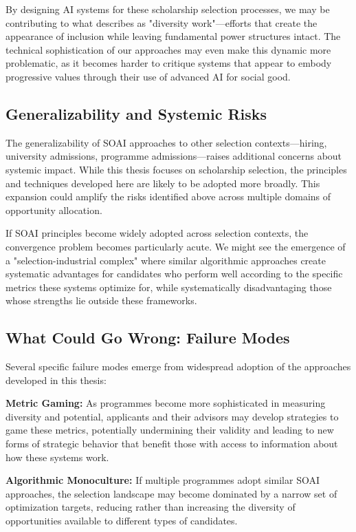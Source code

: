 By designing AI systems for these scholarship selection processes, we may be contributing to what \textcite{Ahmed_2012} describes as "diversity work"—efforts that create the appearance of inclusion while leaving fundamental power structures intact. The technical sophistication of our approaches may even make this dynamic more problematic, as it becomes harder to critique systems that appear to embody progressive values through their use of advanced AI for social good.

\subsection{Generalizability and Systemic Risks}
The generalizability of SOAI approaches to other selection contexts—hiring, university admissions, programme admissions—raises additional concerns about systemic impact. While this thesis focuses on scholarship selection, the principles and techniques developed here are likely to be adopted more broadly. This expansion could amplify the risks identified above across multiple domains of opportunity allocation.

If SOAI principles become widely adopted across selection contexts, the convergence problem becomes particularly acute. We might see the emergence of a "selection-industrial complex" where similar algorithmic approaches create systematic advantages for candidates who perform well according to the specific metrics these systems optimize for, while systematically disadvantaging those whose strengths lie outside these frameworks.

\subsection{What Could Go Wrong: Failure Modes}\label{ssec:wrongs}
Several specific failure modes emerge from widespread adoption of the approaches developed in this thesis:

\textbf{Metric Gaming:} As programmes become more sophisticated in measuring diversity and potential, applicants and their advisors may develop strategies to game these metrics, potentially undermining their validity and leading to new forms of strategic behavior that benefit those with access to information about how these systems work.

\textbf{Algorithmic Monoculture:} If multiple programmes adopt similar SOAI approaches, the selection landscape may become dominated by a narrow set of optimization targets, reducing rather than increasing the diversity of opportunities available to different types of candidates.

